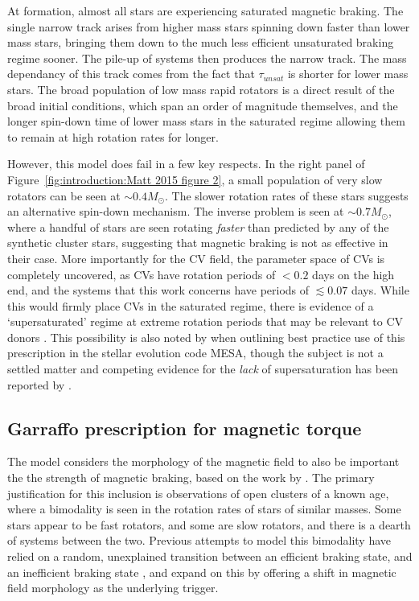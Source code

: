 At formation, almost all stars are experiencing saturated magnetic braking. The single narrow track arises from higher mass stars spinning down faster than lower mass stars, bringing them down to the much less efficient unsaturated braking regime sooner. The pile-up of systems then produces the narrow track. The mass dependancy of this track comes from the fact that $\tau_{unsat}$ is shorter for lower mass stars.
The broad population of low mass rapid rotators is a direct result of the broad initial conditions, which span an order of magnitude themselves, and the longer spin-down time of lower mass stars in the saturated regime allowing them to remain at high rotation rates for longer. 

However, this model does fail in a few key respects. In the right panel of Figure~\ref{fig:introduction:Matt 2015 figure 2}, a small population of very slow rotators can be seen at $\sim 0.4 M_\odot$. The slower rotation rates of these stars suggests an alternative spin-down mechanism. The inverse problem is seen at $\sim 0.7 M_\odot$, where a handful of stars are seen rotating {\it faster} than predicted by any of the synthetic cluster stars, suggesting that magnetic braking is not as effective in their case.
More importantly for the CV field, the parameter space of CVs is completely uncovered, as CVs have rotation periods of $< 0.2$ days on the high end, and the systems that this work concerns have periods of $\lesssim 0.07$ days. While this would firmly place CVs in the saturated regime, there is evidence of a `supersaturated' regime at extreme rotation periods that may be relevant to CV donors \citep{James2000, Wright2011, Argiroffi2016}. This possibility is also noted by \citet{Gossage2021} when outlining best practice use of this prescription in the stellar evolution code MESA, though the subject is not a settled matter and competing evidence for the {\it lack} of supersaturation has been reported by \citet{jeffries2011}.


\subsection{Garraffo prescription for magnetic torque}

The \citet{garraffo2018a} model considers the morphology of the magnetic field to also be important the the strength of magnetic braking, based on the work by \citet{garraffo2015}. The primary justification for this inclusion is observations of open clusters of a known age, where a bimodality is seen in the rotation rates of stars of similar masses. Some stars appear to be fast rotators, and some are slow rotators, and there is a dearth of systems between the two. 
Previous attempts to model this bimodality have relied on a random, unexplained transition between an efficient braking state, and an inefficient braking state \citep{spada2011,reiners2012, gallet2013}, and \citet{garraffo2018a} expand on this by offering a shift in magnetic field morphology as the underlying trigger.

